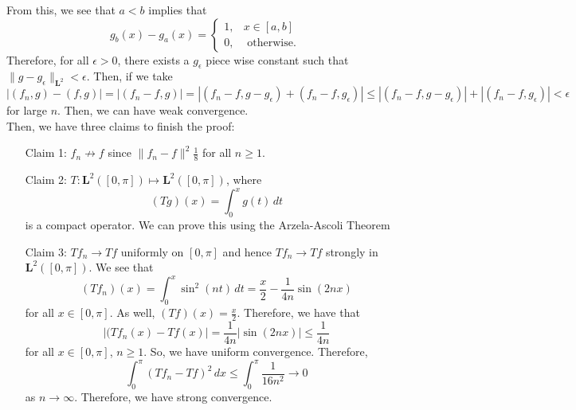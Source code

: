 \documentclass[12pt]{article}
\newcommand{\dint}{\displaystyle\int}
\newcommand{\ml}{\mathbf{L}}
\begin{document}
From this, we see that $a < b$ implies that 
\[g_b(x) - g_a(x) = \begin{cases}
1, & x \in [a, b] \\
0, & \text{ otherwise. }
\end{cases} \]
Therefore, for all $\epsilon > 0$, there exists a $g_{\epsilon}$ piece wise constant such that $\| g - g_{\epsilon } \|_{\ml^2} < \epsilon$. Then, if we take 
\[ |(f_n, g) - (f, g)| = |(f_n - f, g)| = |(f_n - f, g - g_{\epsilon}) + (f_n - f, g_{\epsilon})| \leq |(f_n - f, g - g_{\epsilon}) | + |(f_n - f, g_{\epsilon})| < \epsilon \]
for large $n$. Then, we can have weak convergence. \\
\indent Then, we have three claims to finish the proof:
\begin{enumerate}[topsep=-15pt]
\item[Claim 1:] $f_n \not\to f$ since $\| f_n - f \|^2 \frac{1}{8}$ for all $n \geq 1$. 
\item[Claim 2:] $T: \ml^2([0, \pi]) \mapsto \ml^2([0,\pi])$, where 
\[ (Tg)(x) = \dint_0^{x} g(t) \, dt\]
is a compact operator. We can prove this using the Arzela-Ascoli Theorem
\item[Claim 3:] $T f_n \to Tf$ uniformly on $[0, \pi]$ and hence $Tf_n \to Tf$ strongly in $\ml^2([0, \pi])$. We see that 
\[ (Tf_n)(x) = \dint_0^x \sin^2(nt) \, dt = \frac{x}{2} - \frac{1}{4n} \sin(2nx)\]
for all $x\in [0, \pi]$. As well, $(Tf)(x) = \frac{x}{2}$. Therefore, we have that 
\[ |(Tf_n(x) - Tf(x)| = \frac{1}{4n} |\sin(2nx)| \leq \frac{1}{4n}\]
for all $x\in [0,\pi]$, $n \geq 1$. So, we have uniform convergence. Therefore, 
\[ \dint_0^{\pi} (Tf_n - Tf)^2 \, dx \leq \dint_0^{\pi} \frac{1}{16n^2} \to 0 \]
as $n \to \infty$. Therefore, we have strong convergence. 
\end{enumerate}
\end{document}

